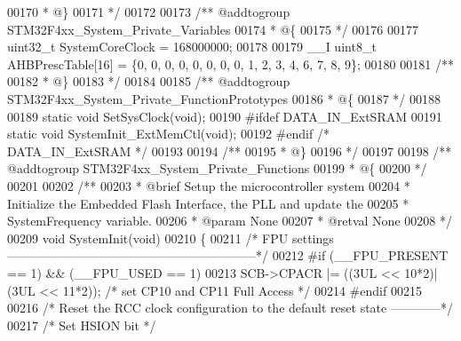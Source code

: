 \begin{DoxyCode}
00170 \textcolor{comment}{  * @\}}
00171 \textcolor{comment}{  */}
00172 
00173 \textcolor{comment}{/** @addtogroup STM32F4xx\_System\_Private\_Variables}
00174 \textcolor{comment}{  * @\{}
00175 \textcolor{comment}{  */}
00176 
00177   uint32\_t SystemCoreClock = 168000000;
00178 
00179   \_\_I uint8\_t AHBPrescTable[16] = \{0, 0, 0, 0, 0, 0, 0, 0, 1, 2, 3, 4, 6, 7, 8, 9\};
00180 
00181 \textcolor{comment}{/**}
00182 \textcolor{comment}{  * @\}}
00183 \textcolor{comment}{  */}
00184 
00185 \textcolor{comment}{/** @addtogroup STM32F4xx\_System\_Private\_FunctionPrototypes}
00186 \textcolor{comment}{  * @\{}
00187 \textcolor{comment}{  */}
00188 
00189 \textcolor{keyword}{static} \textcolor{keywordtype}{void} SetSysClock(\textcolor{keywordtype}{void});
00190 \textcolor{preprocessor}{#}\textcolor{preprocessor}{ifdef} \textcolor{preprocessor}{DATA\_IN\_ExtSRAM}
00191   \textcolor{keyword}{static} \textcolor{keywordtype}{void} SystemInit\_ExtMemCtl(\textcolor{keywordtype}{void});
00192 \textcolor{preprocessor}{#}\textcolor{preprocessor}{endif} \textcolor{comment}{/* DATA\_IN\_ExtSRAM */}
00193 
00194 \textcolor{comment}{/**}
00195 \textcolor{comment}{  * @\}}
00196 \textcolor{comment}{  */}
00197 
00198 \textcolor{comment}{/** @addtogroup STM32F4xx\_System\_Private\_Functions}
00199 \textcolor{comment}{  * @\{}
00200 \textcolor{comment}{  */}
00201 
00202 \textcolor{comment}{/**}
00203 \textcolor{comment}{  * @brief  Setup the microcontroller system}
00204 \textcolor{comment}{  *         Initialize the Embedded Flash Interface, the PLL and update the }
00205 \textcolor{comment}{  *         SystemFrequency variable.}
00206 \textcolor{comment}{  * @param  None}
00207 \textcolor{comment}{  * @retval None}
00208 \textcolor{comment}{  */}
00209 \textcolor{keywordtype}{void} SystemInit(\textcolor{keywordtype}{void})
00210 \{
00211   \textcolor{comment}{/* FPU settings ------------------------------------------------------------*/}
00212   \textcolor{preprocessor}{#}\textcolor{preprocessor}{if} \textcolor{preprocessor}{(}__FPU_PRESENT \textcolor{preprocessor}{==} 1\textcolor{preprocessor}{)} \textcolor{preprocessor}{&&} \textcolor{preprocessor}{(}\textcolor{preprocessor}{\_\_FPU\_USED} \textcolor{preprocessor}{==} 1\textcolor{preprocessor}{)}
00213     SCB->CPACR |= ((3UL << 10*2)|(3UL << 11*2));  \textcolor{comment}{/* set CP10 and CP11 Full Access */}
00214   \textcolor{preprocessor}{#}\textcolor{preprocessor}{endif}
00215 
00216   \textcolor{comment}{/* Reset the RCC clock configuration to the default reset state ------------*/}
00217   \textcolor{comment}{/* Set HSION bit */}

\end{DoxyCode}
